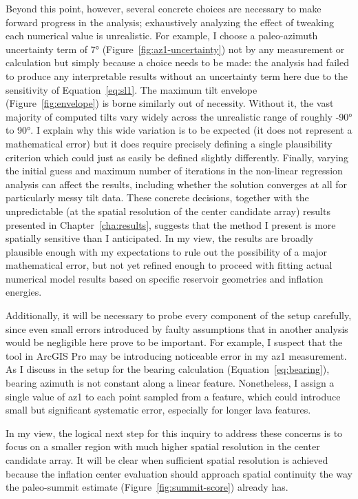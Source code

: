 Beyond this point, however, several concrete choices are necessary to make forward progress in the analysis; exhaustively analyzing the effect of tweaking each numerical value is unrealistic. For example, I choose a paleo-azimuth uncertainty term of \ang{7} (Figure~\ref{fig:az1-uncertainty}) not by any measurement or calculation but simply because a choice needs to be made: the analysis had failed to produce any interpretable results without an uncertainty term here due to the sensitivity of Equation~\eqref{eq:sl1}. The maximum tilt envelope (Figure~\ref{fig:envelope}) is borne similarly out of necessity. Without it, the vast majority of computed tilts vary widely across the unrealistic range of roughly \ang{-90} to \ang{90}. I explain why this wide variation is to be expected (it does not represent a mathematical error) but it does require precisely defining a single plausibility criterion which could just as easily be defined slightly differently. Finally, varying the initial guess and maximum number of iterations in the non-linear regression analysis can affect the results, including whether the solution converges at all for particularly messy tilt data. These concrete decisions, together with the unpredictable (at the spatial resolution of the center candidate array) results presented in Chapter~\ref{cha:results}, suggests that the method I present is more spatially sensitive than I anticipated. In my view, the results are broadly plausible enough with my expectations to rule out the possibility of a major mathematical error, but not yet refined enough to proceed with fitting actual numerical model results based on specific reservoir geometries and inflation energies.

Additionally, it will be necessary to probe every component of the setup carefully, since even small errors introduced by faulty assumptions that in another analysis would be negligible here prove to be important. For example, I suspect that the  tool in ArcGIS Pro may be introducing noticeable error in my \acl{az1} measurement. As I discuss in the setup for the \acs{bearing} calculation (Equation~\eqref{eq:bearing}), bearing azimuth is not constant along a linear feature. Nonetheless, I assign a single value of \acs{az1} to each point sampled from a feature, which could introduce small but significant systematic error, especially for longer lava features.

In my view, the logical next step for this inquiry to address these concerns is to focus on a smaller region with much higher spatial resolution in the center candidate array. It will be clear when sufficient spatial resolution is achieved because the inflation center evaluation should approach spatial continuity the way the paleo-summit estimate (Figure~\ref{fig:summit-score}) already has.


